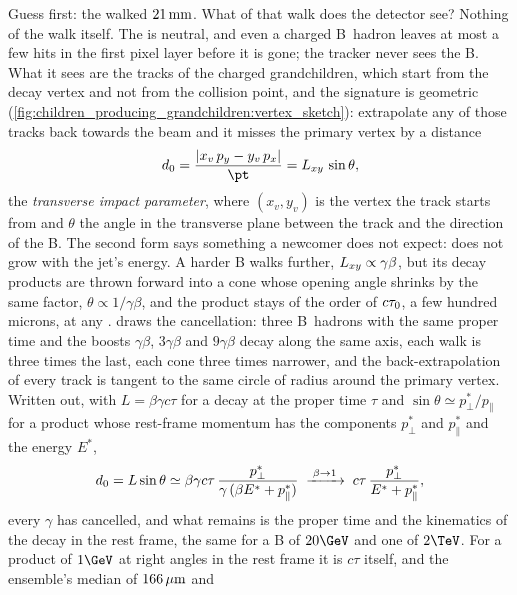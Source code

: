 Guess first: the \Bbar walked $21\,\mathrm{mm}$. What of that walk does the detector
see? Nothing of the walk itself. The \Bbar is neutral, and even a charged
B~hadron leaves at most a few hits in the first pixel layer before it is
gone; the tracker never sees the B. What it sees are the tracks of the
charged grandchildren, which start from the decay vertex and not from the
collision point, and the signature is geometric
(\cref{fig:children_producing_grandchildren:vertex_sketch}): extrapolate
any of those tracks back towards the beam and it misses the primary vertex
by a distance
\begin{equation}
  \dzero=\frac{|x_v\,p_y-y_v\,p_x|}{\pt}=\Lxy\,\sin\theta,
  \label{eq:children_producing_grandchildren:d0}
\end{equation}
the \emph{transverse impact parameter}, where $(x_v,y_v)$ is the vertex
the track starts from and $\theta$ the angle in the transverse plane
between the track and the direction of the B. The second form says
something a newcomer does not expect: \dzero does not grow with the jet's
energy. A harder B walks further, $L_{xy}\propto\gamma\beta$, but its
decay products are thrown forward into a cone whose opening angle shrinks
by the same factor, $\theta\propto1/\gamma\beta$, and the product stays of
the order of $c\tau_0$, a few hundred microns, at any \pt.
 draws the
cancellation: three B~hadrons with the same proper time and the boosts
$\gamma\beta$, $3\gamma\beta$ and $9\gamma\beta$ decay along the same
axis, each walk is three times the last, each cone three times narrower,
and the back-extrapolation of every track is tangent to the same circle
of radius \dzero around the primary vertex. Written out, with
$L=\beta\gamma c\tau$ for a decay at the proper time $\tau$ and
$\sin\theta\simeq p^*_\perp/p_\parallel$ for a product whose rest-frame momentum has the
components $p^*_\perp$ and $p^*_\parallel$ and the energy $E^*$,
\begin{equation}
  d_0=L\sin\theta
  \simeq\beta\gamma c\tau\,\frac{p^*_\perp}{\gamma\,(\beta E^*+p^*_\parallel)}
  \;\xrightarrow{\;\beta\to1\;}\;
  c\tau\,\frac{p^*_\perp}{E^*+p^*_\parallel},
  \label{eq:children_producing_grandchildren:d0boost}
\end{equation}
every $\gamma$ has cancelled, and what remains is the proper time and the
kinematics of the decay in the rest frame, the same for a B of $20\GeV$
and one of $2\TeV$. For a product of $1\GeV$ at right angles in the rest
frame it is $c\tau$ itself, and the ensemble's median of $166\,\mu\mathrm{m}$ and
